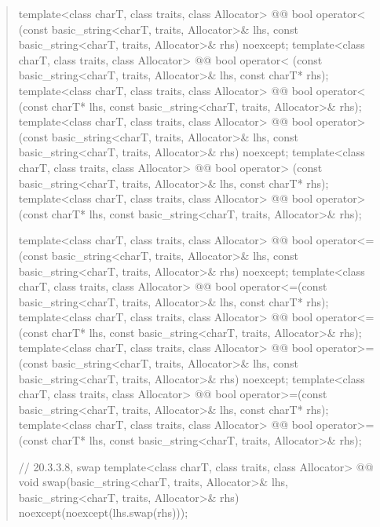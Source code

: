 \documentclass{wg21}
\begin{document}
\begin{quote}
\begin{codeblock}
{  template<class charT, class traits, class Allocator>
    @@
    bool operator< (const basic_string<charT, traits, Allocator>& lhs,
                    const basic_string<charT, traits, Allocator>& rhs) noexcept;
  template<class charT, class traits, class Allocator>
    @@
    bool operator< (const basic_string<charT, traits, Allocator>& lhs,
                    const charT* rhs);
  template<class charT, class traits, class Allocator>
    @@
    bool operator< (const charT* lhs,
                    const basic_string<charT, traits, Allocator>& rhs);
  template<class charT, class traits, class Allocator>
    @@
    bool operator> (const basic_string<charT, traits, Allocator>& lhs,
                    const basic_string<charT, traits, Allocator>& rhs) noexcept;
  template<class charT, class traits, class Allocator>
    @@
    bool operator> (const basic_string<charT, traits, Allocator>& lhs,
                    const charT* rhs);
  template<class charT, class traits, class Allocator>
    @@
    bool operator> (const charT* lhs,
                    const basic_string<charT, traits, Allocator>& rhs);

  template<class charT, class traits, class Allocator>
    @@
    bool operator<=(const basic_string<charT, traits, Allocator>& lhs,
                    const basic_string<charT, traits, Allocator>& rhs) noexcept;
  template<class charT, class traits, class Allocator>
    @@
    bool operator<=(const basic_string<charT, traits, Allocator>& lhs,
                    const charT* rhs);
  template<class charT, class traits, class Allocator>
    @@
    bool operator<=(const charT* lhs,
                    const basic_string<charT, traits, Allocator>& rhs);
  template<class charT, class traits, class Allocator>
    @@
    bool operator>=(const basic_string<charT, traits, Allocator>& lhs,
                    const basic_string<charT, traits, Allocator>& rhs) noexcept;
  template<class charT, class traits, class Allocator>
    @@
    bool operator>=(const basic_string<charT, traits, Allocator>& lhs,
                    const charT* rhs);
  template<class charT, class traits, class Allocator>
    @@
    bool operator>=(const charT* lhs,
                    const basic_string<charT, traits, Allocator>& rhs);

  // 20.3.3.8, swap
  template<class charT, class traits, class Allocator>
    @@
    void swap(basic_string<charT, traits, Allocator>& lhs,
              basic_string<charT, traits, Allocator>& rhs)
      noexcept(noexcept(lhs.swap(rhs)));

}
\end{codeblock}
\end{quote}
\end{document}
